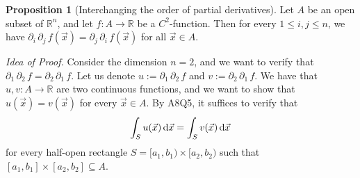 \documentclass[11pt]{article}
\theoremstyle{definition}
\newtheorem{prop}[thm]{Proposition}
\newcommand{\R}{\ensuremath{\mathbb{R}}}
\begin{document}
\begin{prop}[Interchanging the order of partial derivatives]
Let $A$ be an open subset of $\R^n$, and let $f : A \to \R$ be a $C^2$-function. Then for every $1 \leq i, j \leq n$, we have $\partial_i\,\partial_j\,f(\vec{x}) = \partial_j\,\partial_i\,f(\vec{x})$ for all $\vec{x} \in A$.

\emph{Idea of Proof.} Consider the dimension $n = 2$, and we want to verify that $\partial_1\,\partial_2\,f = \partial_2\,\partial_1\,f$. Let us denote $u := \partial_1\,\partial_2\,f$ and $v := \partial_2\,\partial_1\,f$. We have that $u, v : A \to \R$ are two continuous functions, and we want to show that $u(\vec{x}) = v(\vec{x})$ for every $\vec{x} \in A$. By A8Q5, it suffices to verify that
$$\int_S u(\vec{x})\,{\rm d}\vec{x} = \int_S v(\vec{x})\,{\rm d}\vec{x}$$
for every half-open rectangle $S = [a_1, b_1) \times [a_2, b_2)$ such that $[a_1, b_1] \times [a_2, b_2] \subseteq A$.


\end{prop}
\end{document}

